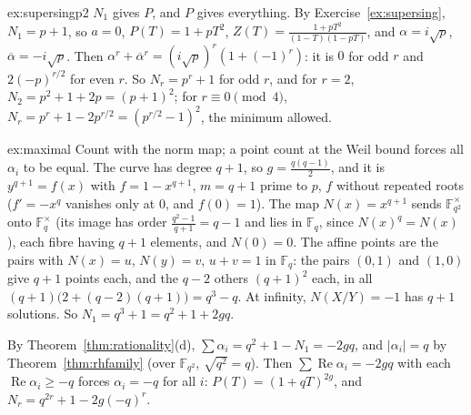 \begin{solution}{ex:supersingp2}
\idea $N_1$ gives $P$, and $P$ gives everything.
\writeup By Exercise~\ref{ex:supersing}, $N_1=p+1$, so $a=0$, $P(T)=1+pT^2$, $Z(T)=\frac{1+pT^2}{(1-T)(1-pT)}$, and $\alpha=i\sqrt p$, $\overline\alpha=-i\sqrt p$.
Then $\alpha^r+\overline\alpha^r=(i\sqrt p)^r(1+(-1)^r)$: it is $0$ for odd $r$ and $2(-p)^{r/2}$ for even $r$. So $N_r=p^r+1$ for odd $r$, and for $r=2$,
$N_2=p^2+1+2p=(p+1)^2$; for $r\equiv0\pmod4$, $N_r=p^r+1-2p^{r/2}=(p^{r/2}-1)^2$, the minimum allowed.
\end{solution}

\begin{solution}{ex:maximal}
\idea Count with the norm map; a point count at the Weil bound forces all $\alpha_i$ to be equal.
\writeup The curve has degree $q+1$, so $g=\frac{q(q-1)}2$, and it is $y^{q+1}=f(x)$ with $f=1-x^{q+1}$, $m=q+1$ prime to $p$, $f$ without repeated roots
($f'=-x^q$ vanishes only at $0$, and $f(0)=1$). The map $N(x)=x^{q+1}$ sends $\mathbb F_{q^2}^\times$ onto $\mathbb F_q^\times$ (its image has order
$\frac{q^2-1}{q+1}=q-1$ and lies in $\mathbb F_q$, since $N(x)^q=N(x)$), each fibre having $q+1$ elements, and $N(0)=0$. The affine points are the pairs with
$N(x)=u$, $N(y)=v$, $u+v=1$ in $\mathbb F_q$: the pairs $(0,1)$ and $(1,0)$ give $q+1$ points each, and the $q-2$ others $(q+1)^2$ each, in all
$(q+1)\bigl(2+(q-2)(q+1)\bigr)=q^3-q$. At infinity, $N(X/Y)=-1$ has $q+1$ solutions. So $N_1=q^3+1=q^2+1+2gq$.

By Theorem~\ref{thm:rationality}(d), $\sum\alpha_i=q^2+1-N_1=-2gq$, and $|\alpha_i|=q$ by Theorem~\ref{thm:rhfamily} (over $\mathbb F_{q^2}$, $\sqrt{q^2}=q$). Then
$\sum\operatorname{Re}\alpha_i=-2gq$ with each $\operatorname{Re}\alpha_i\ge-q$ forces $\alpha_i=-q$ for all $i$: $P(T)=(1+qT)^{2g}$, and $N_r=q^{2r}+1-2g(-q)^r$.
\end{solution}

